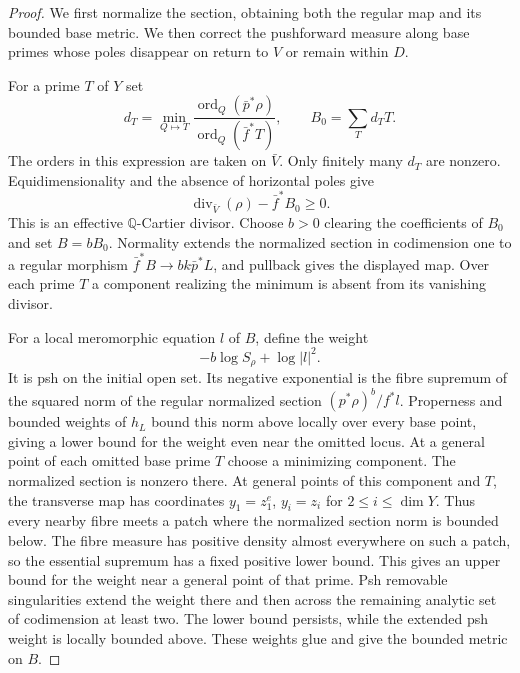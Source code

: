 \begin{proof}
We first normalize the section, obtaining both the regular map and its
bounded base metric. We then correct the pushforward measure along base
primes whose poles disappear on return to $V$ or remain within $D$.

For a prime $T$ of $Y$ set
\[
 d_T=\min_{Q\mapsto T}
       \frac{\operatorname{ord}_Q(\bar p^*\rho)}
            {\operatorname{ord}_Q(\bar f^*T)},
 \qquad B_0=\sum_Td_TT.
\]
The orders in this expression are taken on $\bar V$.  Only finitely
many $d_T$ are nonzero.  Equidimensionality and the absence of
horizontal poles give
\[
             \operatorname{div}_{\bar V}(\rho)-\bar f^*B_0\geq0.
\]
This is an effective $\mathbb Q$-Cartier divisor.  Choose $b>0$ clearing
the coefficients of $B_0$ and set $B=bB_0$.  Normality extends the
normalized section in codimension one to a regular morphism
$\bar f^*B\to bk\bar p^*L$, and pullback gives the displayed map.
Over each prime $T$ a component realizing the minimum is absent from
its vanishing divisor.

For a local meromorphic equation $l$ of $B$, define the weight
\[
                     -b\log S_\rho+\log|l|^2.
\]
It is psh on the initial open set.  Its negative exponential is the
fibre supremum of the squared norm of the regular normalized section
$(p^*\rho)^b/f^*l$.  Properness and bounded weights of $h_L$ bound this
norm above locally over every base point, giving a lower bound for the
weight even near the omitted locus. At a general point of each
omitted base prime $T$ choose a minimizing component. The normalized section
is nonzero there. At general points of this component and $T$, the
transverse map has coordinates $y_1=z_1^e$, $y_i=z_i$ for
$2\leq i\leq\dim Y$. Thus every nearby fibre meets a patch where
the normalized section norm is bounded below. The fibre
measure has positive density almost everywhere on such a patch, so
the essential supremum has a fixed positive lower bound.  This gives
an upper bound for the weight near a general point of that prime.
Psh removable singularities extend the weight there and then across
the remaining analytic set of codimension at least two.  The lower
bound persists, while the extended psh weight is locally bounded
above.  These weights glue and give the bounded metric on $B$.


\end{proof}
